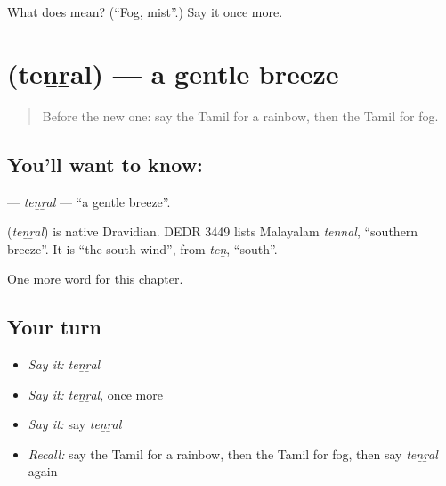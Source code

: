 \begin{tcolorbox}[breakable,colback=teal!4,colframe=teal!35!black,title={Before you move on}]
What does  mean? (\textquotedblleft{}Fog, mist\textquotedblright{}.) Say it once more.
\end{tcolorbox}
\section[\texorpdfstring{\ta{தென்றல்} (teṉṟal)}{தென்றல் (teṉṟal)}]{ (teṉṟal) — a gentle breeze}

\label{lesson:TA-C219-tenral}



\begin{quote}
Before the new one: say the Tamil for a rainbow, then the Tamil for fog.
\end{quote}

\subsection*{You'll want to know: }
\textbf{} — \emph{teṉṟal} — \textquotedblleft{}a gentle breeze\textquotedblright{}.

\begin{cousinweb}
\textbf{} (\emph{teṉṟal}) is native Dravidian. DEDR 3449 lists Malayalam \emph{tennal}, \textquotedblleft{}southern breeze\textquotedblright{}. It is \textquotedblleft{}the south wind\textquotedblright{}, from \emph{teṉ}, \textquotedblleft{}south\textquotedblright{}.
\end{cousinweb}

\begin{grammarlens}[title={What you've built}]
One more word for this chapter.
\end{grammarlens}

\subsection*{Your turn}
\begin{itemize}
\raggedright
  \item \emph{Say it:} \emph{teṉṟal}
  \item \emph{Say it:} \emph{teṉṟal}, once more
  \item \emph{Say it:} say \emph{teṉṟal}
  \item \emph{Recall:} say the Tamil for a rainbow, then the Tamil for fog, then say \emph{teṉṟal} again
\end{itemize}

